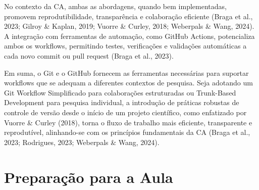 \documentclass[
  a4paper,
]{book}
\begin{document}
No contexto da CA, ambas as abordagens, quando bem implementadas,
promovem reprodutibilidade, transparência e colaboração eficiente (Braga
et al., 2023; Gilroy \& Kaplan, 2019; Vuorre \& Curley, 2018; Weberpals
\& Wang, 2024). A integração com ferramentas de automação, como GitHub
Actions, potencializa ambos os workflows, permitindo testes,
verificações e validações automáticas a cada novo commit ou pull request
(Braga et al., 2023).

Em suma, o Git e o GitHub fornecem as ferramentas necessárias para
suportar workflows que se adequam a diferentes contextos de pesquisa.
Seja adotando um Git Workflow Simplificado para colaborações
estruturadas ou Trunk-Based Development para pesquisa individual, a
introdução de práticas robustas de controle de versão desde o início de
um projeto científico, como enfatizado por Vuorre \& Curley (2018),
torna o fluxo de trabalho mais eficiente, transparente e reprodutível,
alinhando-se com os princípios fundamentais da CA (Braga et al., 2023;
Rodrigues, 2023; Weberpals \& Wang, 2024).

\section{Preparação para a Aula}\label{preparauxe7uxe3o-para-a-aula-4}
\end{document}
